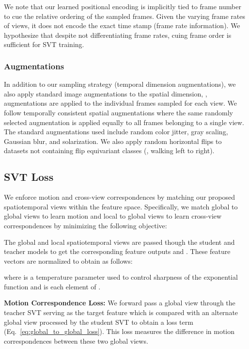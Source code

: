 \documentclass[10pt,twocolumn,letterpaper]{article}
\begin{document}
We note that our learned positional encoding is implicitly tied to frame number to cue the relative ordering of the sampled frames. Given the varying frame rates of views, it does not encode the exact time stamp (frame rate information). We hypothesize that despite not differentiating frame rates, cuing frame order is sufficient for SVT training. 

\vspace{-0.7em}
\subsubsection{Augmentations}
\vspace{-0.5em}
In addition to our sampling strategy (temporal dimension augmentations), we also apply standard image augmentations to the spatial dimension, \ie, augmentations are applied to the individual frames sampled for each view. We follow temporally consistent spatial augmentations \cite{qian2020spatiotemporal} where the same randomly selected augmentation is applied equally to all frames belonging to a single view. The standard augmentations used include random color jitter, gray scaling, Gaussian blur, and solarization. We also apply random horizontal flips to datasets not containing flip equivariant classes (\eg, walking left to right). 


\subsection{SVT Loss}
\label{subsec:svt_loss}
We enforce motion and cross-view correspondences by matching our proposed spatiotemporal views within the feature space. Specifically, we match global to global views to learn motion and local to global views to learn cross-view correspondences by minimizing the following objective:

The global and local spatiotemporal views are passed though the student and teacher models to get the corresponding feature outputs  and . These feature vectors are normalized to obtain  as follows: 

where  is a temperature parameter used to control sharpness of the exponential function \cite{caron2021emerging} and  is each element of .  

\vspace{0.1em}
\noindent\textbf{Motion Correspondence Loss:}
We forward pass a global view through the teacher SVT serving as the target feature which is compared with an alternate global view processed by the student SVT to obtain a loss term (Eq.~\ref{eq:global_to_global_loss}). This loss measures the difference in motion correspondences between these two global views.
\end{document}
